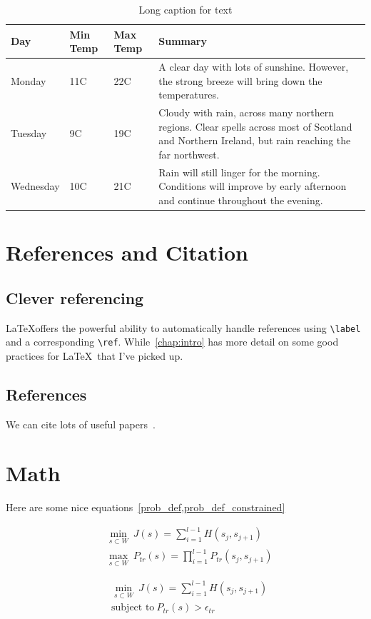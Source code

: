 \begin{table}
\begin{center}
    \begin{tabular}{ | l | l | l | p{5cm} |}
    \hline
    Day & Min Temp & Max Temp & Summary \\ \hline
    Monday & 11C & 22C & A clear day with lots of sunshine.  
    However, the strong breeze will bring down the temperatures. \\ \hline
    Tuesday & 9C & 19C & Cloudy with rain, across many northern regions. Clear spells 
    across most of Scotland and Northern Ireland, 
    but rain reaching the far northwest. \\ \hline
    Wednesday & 10C & 21C & Rain will still linger for the morning. 
    Conditions will improve by early afternoon and continue 
    throughout the evening. \\
    \hline
    \end{tabular}
    \caption[Short caption for table]{Long caption for text \label{tab:table}}
    \end{center}
\end{table}

\section{References and Citation}

\subsection{Clever referencing}
\LaTeX offers the powerful ability to automatically handle references using \verb+\label+ and a corresponding \verb+\ref+.
While~\cref{chap:intro} has more detail on some good practices for \LaTeX~that I've picked up.

\subsection{References}

We can cite lots of useful papers~\cite{bhat2000,chaturvedi2011a}.

\section{Math}

Here are some nice equations~\cref{prob_def,prob_def_constrained}

\begin{align}
\label{prob_def}
&\min_{s\subset W}\ J(s) = \sum_{i=1}^{l-1} H(s_j, s_{j+1}) \\
&\max_{s\subset W}\ P_{tr}(s) = \prod_{i=1}^{l-1} P_{tr}(s_j, s_{j+1}) \nonumber
\end{align}

\begin{align}
\label{prob_def_constrained}
&\min_{s\subset W}\ J(s) = \sum_{i=1}^{l-1} H(s_j, s_{j+1}) \\
&\text{subject to} \ P_{tr}(s)>\epsilon_{tr} \nonumber
\end{align}
